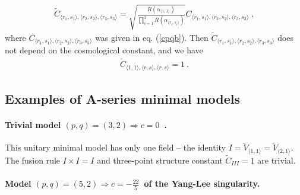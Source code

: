 \documentclass[12pt,a4paper,notitlepage]{report}
\numberwithin{equation}{section}
\theoremstyle{break}
\begin{document}
\begin{align}
 \tilde{C}_{\langle r_1,s_1\rangle ,\langle r_2,s_2\rangle ,\langle r_3,s_3 \rangle} = \sqrt{\frac{R(\alpha_{\langle 1,1 \rangle})}{\prod_{i=1}^3 R(\alpha_{\langle r_i,s_i \rangle})}}  C_{\langle r_1,s_1\rangle ,\langle r_2,s_2\rangle ,\langle r_3,s_3 \rangle}\ ,
\label{tcc}
\end{align}
where $C_{\langle r_1,s_1\rangle ,\langle r_2,s_2\rangle ,\langle r_3,s_3 \rangle}$ was given in eq. (\ref{cpqb}). Then $\tilde{C}_{\langle r_1,s_1\rangle ,\langle r_2,s_2\rangle ,\langle r_3,s_3 \rangle}$ does not depend on the cosmological constant, and we have 
\begin{align}
\boxed{ \tilde{C}_{\langle 1,1\rangle , \langle r,s \rangle,\langle r,s \rangle}=1}\ .
\end{align}



\subsection{Examples of A-series minimal models}

\paragraph{Trivial model $(p,q)=(3,2) \Rightarrow c = 0$\ .}

This unitary minimal model has only one field -- the identity $I=\tilde{V}_{\langle 1,1 \rangle}=\tilde{V}_{\langle 2,1 \rangle}$. The fusion rule $I\times I = I$ and three-point structure constant $\tilde{C}_{III} = 1$ are trivial.

\paragraph{Model $(p,q)=(5,2) \Rightarrow c=-\tfrac{22}{5}$\ of the Yang-Lee singularity.}
\end{document}
